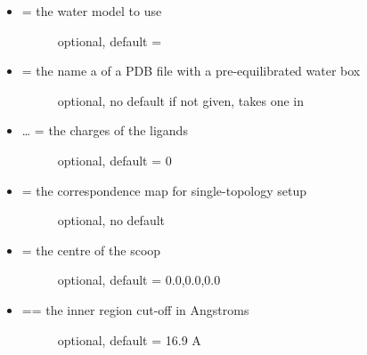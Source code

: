 \documentclass[letterpaper,10pt,english]{sphinxmanual}
\begin{document}
\begin{itemize}
\item {} \begin{description}
\item[{ = the water model to use}] \leavevmode
optional, default = 

\end{description}

\item {} \begin{description}
\item[{ = the name a of a PDB file with a pre-equilibrated water box}] \leavevmode
optional, no default
if not given, takes one in 

\end{description}

\item {} \begin{description}
\item[{ … = the charges of the ligands}] \leavevmode
optional, default = 0

\end{description}

\item {} \begin{description}
\item[{ = the correspondence map for single-topology setup}] \leavevmode
optional, no default

\end{description}

\item {} \begin{description}
\item[{ = the centre of the scoop}] \leavevmode
optional, default = 0.0,0.0,0.0

\end{description}

\item {} \begin{description}
\item[{ == the inner region cut-off in Angstroms}] \leavevmode
optional, default = 16.9 A

\end{description}


\end{itemize}
\end{document}

